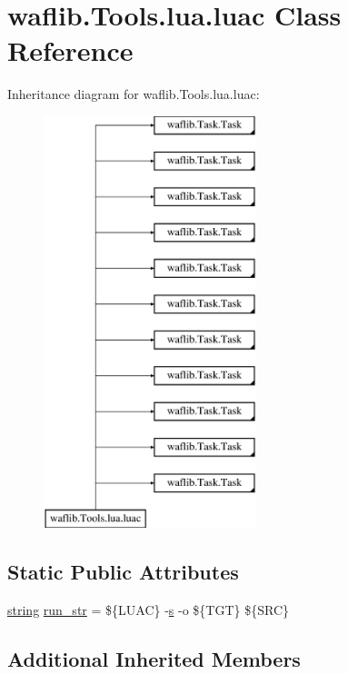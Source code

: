 \hypertarget{classwaflib_1_1_tools_1_1lua_1_1luac}{}\section{waflib.\+Tools.\+lua.\+luac Class Reference}
\label{classwaflib_1_1_tools_1_1lua_1_1luac}
Inheritance diagram for waflib.\+Tools.\+lua.\+luac\+:\begin{figure}[H]
\begin{center}
\leavevmode
\includegraphics[height=12.000000cm]{classwaflib_1_1_tools_1_1lua_1_1luac}
\end{center}
\end{figure}
\subsection*{Static Public Attributes}
\begin{DoxyCompactItemize}
\item 
\hyperlink{test__lib_f_l_a_c_2format_8c_ab02026ad0de9fb6c1b4233deb0a00c75}{string} \hyperlink{classwaflib_1_1_tools_1_1lua_1_1luac_ab701f4d53f79abc843ae006c23008c9a}{run\+\_\+str} = \textquotesingle{}\$\{L\+U\+AC\} -\/\hyperlink{lib_2expat_8h_a755339d27872b13735c2cab829e47157}{s} -\/o \$\{T\+GT\} \$\{S\+RC\}\textquotesingle{}
\end{DoxyCompactItemize}
\subsection*{Additional Inherited Members}


